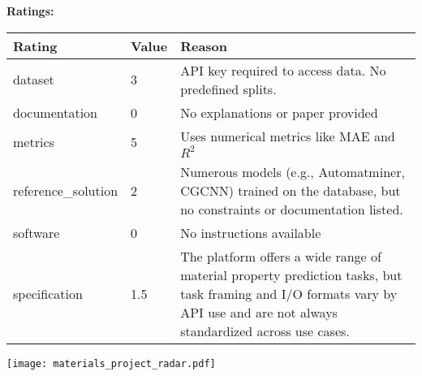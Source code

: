 {{{\bf Ratings:} ~ \\

\begin{tabular}{p{} p{} p{}}
\hline
Rating & Value & Reason \\
\hline
dataset & 3 & API key required to access data. No predefined splits.
 \\
documentation & 0 & No explanations or paper provided
 \\
metrics & 5 & Uses numerical metrics like MAE and $R^2$
 \\
reference\_solution & 2 & Numerous models (e.g., Automatminer, CGCNN) trained on the database, but no constraints or documentation listed.
 \\
software & 0 & No instructions available
 \\
specification & 1.5 & The platform offers a wide range of material property prediction tasks, but task framing and I/O formats vary by API use and are not always standardized across use cases.
 \\
\hline
\end{tabular}

\texttt{[image: materials\_project\_radar.pdf]}
}}
\clearpage